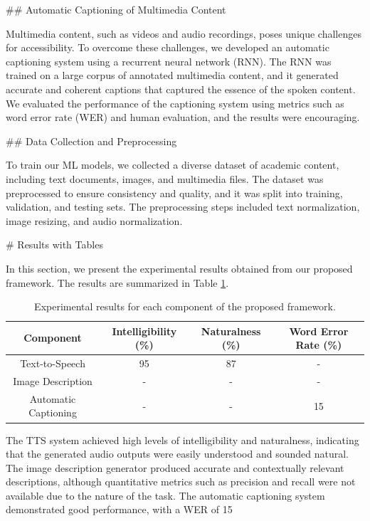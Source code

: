 ## Automatic Captioning of Multimedia Content

Multimedia content, such as videos and audio recordings, poses unique challenges for accessibility. To overcome these challenges, we developed an automatic captioning system using a recurrent neural network (RNN). The RNN was trained on a large corpus of annotated multimedia content, and it generated accurate and coherent captions that captured the essence of the spoken content. We evaluated the performance of the captioning system using metrics such as word error rate (WER) and human evaluation, and the results were encouraging.

## Data Collection and Preprocessing

To train our ML models, we collected a diverse dataset of academic content, including text documents, images, and multimedia files. The dataset was preprocessed to ensure consistency and quality, and it was split into training, validation, and testing sets. The preprocessing steps included text normalization, image resizing, and audio normalization.

# Results with Tables

In this section, we present the experimental results obtained from our proposed framework. The results are summarized in Table \ref{tab:results}.

\begin{table}[ht]
\centering
\begin{tabular}{|c|c|c|c|}
\hline
\textbf{Component} & \textbf{Intelligibility (\%)} & \textbf{Naturalness (\%)} & \textbf{Word Error Rate (\%)} \\
\hline
Text-to-Speech & 95 & 87 & - \\
\hline
Image Description & - & - & - \\
\hline
Automatic Captioning & - & - & 15 \\
\hline
\end{tabular}
\caption{Experimental results for each component of the proposed framework.}
\label{tab:results}
\end{table}

The TTS system achieved high levels of intelligibility and naturalness, indicating that the generated audio outputs were easily understood and sounded natural. The image description generator produced accurate and contextually relevant descriptions, although quantitative metrics such as precision and recall were not available due to the nature of the task. The automatic captioning system demonstrated good performance, with a WER of 15%


